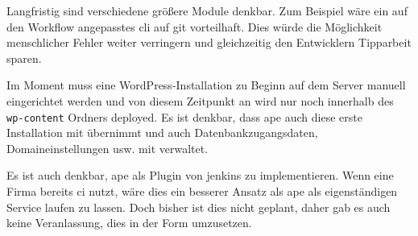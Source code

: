Langfristig sind verschiedene größere Module denkbar. Zum Beispiel wäre ein auf den Workflow angepasstes \gls{cli} auf \gls{git} vorteilhaft. Dies würde die Möglichkeit menschlicher Fehler weiter verringern und gleichzeitig den Entwicklern Tipparbeit sparen.

Im Moment muss eine WordPress-Installation zu Beginn auf dem Server manuell eingerichtet werden und von diesem Zeitpunkt an wird nur noch innerhalb des \lstinline!wp-content! Ordners deployed. Es ist denkbar, dass \gls{ape} auch diese erste Installation mit übernimmt und auch Datenbankzugangsdaten, Domaineinstellungen usw. mit verwaltet.

Es ist auch denkbar, \gls{ape} als Plugin von \gls{jenkins} zu implementieren. Wenn eine Firma bereits \gls{ci} nutzt, wäre dies ein besserer Ansatz als \gls{ape} als eigenständigen Service laufen zu lassen. Doch bisher ist dies nicht geplant, daher gab es auch keine Veranlassung, dies in der Form umzusetzen.
